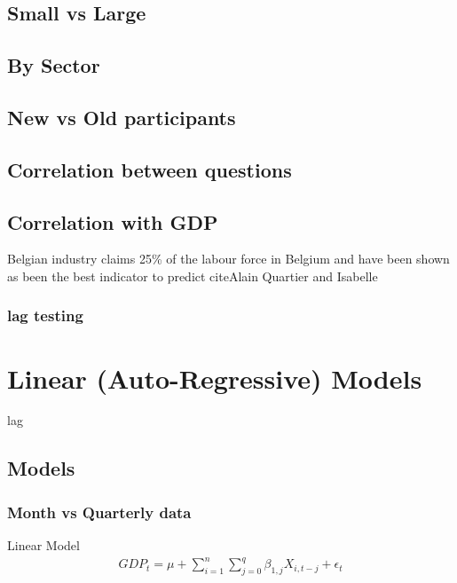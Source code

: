 \documentclass[12pt,a4paper,oneside]{book}
\begin{document}
\section{Small vs Large}


\section{By Sector}


\section{New vs Old participants}


\section{Correlation between questions}
 

\section{Correlation with GDP}

Belgian industry claims 25\% of the labour force in Belgium and have been shown as been the best indicator to predict cite{Alain Quartier and Isabelle}


\subsection{lag testing}



\chapter{Linear (Auto-Regressive) Models}



lag

\section{Models}

\subsection{Month vs Quarterly data}

Linear Model
\begin{eqnarray}
    GDP_{t} = \mu + \sum^n_{i = 1} \sum^q_{j = 0}
       \beta_{1,j} X_{i,t-j} + \epsilon_t 
\end{eqnarray}
\end{document}
